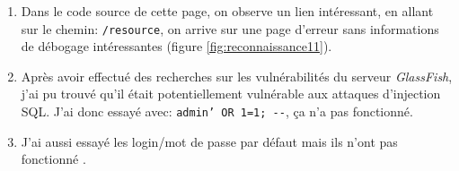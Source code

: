 \documentclass[a4paper]{article}
\begin{document}
\begin{itemize}
\begin{example}
\begin{enumerate}
            \item Dans le code source de cette page, on observe un lien intéressant, en allant sur le chemin: \texttt{\footnotesize /resource}, on arrive sur une page d'erreur sans informations de débogage intéressantes (figure \ref{fig:reconnaissance11}).
            \item Après avoir effectué des recherches sur les vulnérabilités du serveur \textit{GlassFish}, j'ai pu trouvé qu'il était potentiellement vulnérable aux attaques d'injection SQL. J'ai donc essayé avec: \texttt{\footnotesize admin' OR 1=1; -{}-}, ça n'a pas fonctionné.
            \item J'ai aussi essayé les login/mot de passe par défaut mais ils n'ont pas fonctionné \cite{1}.
        \end{enumerate}
    \end{example}
\end{itemize}
\end{document}
